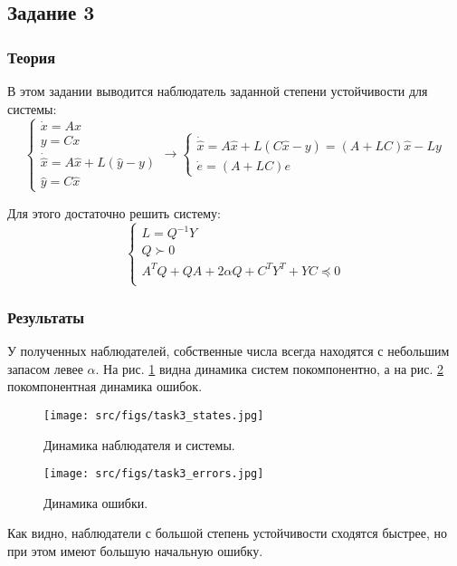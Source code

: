 \subsection{Задание 3}

\subsubsection{Теория}

В этом задании выводится наблюдатель заданной степени устойчивости для системы:
\[
        \begin{cases}
                \dot{x} = A x \\
                y = C x \\
                \dot{\hat{x}} = A \hat{x} + L(\hat{y} - y) \\
                \hat{y} = C \hat{x}
        \end{cases} \rightarrow
        \begin{cases}
            \dot{\hat{x}} = A \hat{x} + L(C \hat{x} - y) = (A + LC )\hat{x} - Ly \\
            \dot{e} = (A + LC)e
            
    \end{cases}
\]

Для этого достаточно решить систему:
\[
        \begin{cases}
                L = Q^{-1}Y\\
                Q \succ 0 \\
                A^TQ + QA + 2 \alpha Q + C^T Y^T + YC \preccurlyeq 0  \\
        \end{cases} 
\]
\subsubsection{Результаты}
У полученных наблюдателей, собственные числа всегда находятся с небольшим запасом левее \(\alpha\). На рис. \ref{fig:task3_states} видна динамика систем покомпонентно, а на рис. \ref{fig:task3_errors} покомпонентная динамика ошибок.
\begin{figure}[ht!]
  \centering
  \texttt{[image: src/figs/task3\_states.jpg]}
  \caption{Динамика наблюдателя и системы.}
  \label{fig:task3_states}
\end{figure}
\begin{figure}[ht!]
  \centering
  \texttt{[image: src/figs/task3\_errors.jpg]}
  \caption{Динамика ошибки.}
  \label{fig:task3_errors}
\end{figure}
\FloatBarrier

Как видно, наблюдатели с большой степень устойчивости сходятся быстрее, но при этом имеют большую начальную ошибку.
